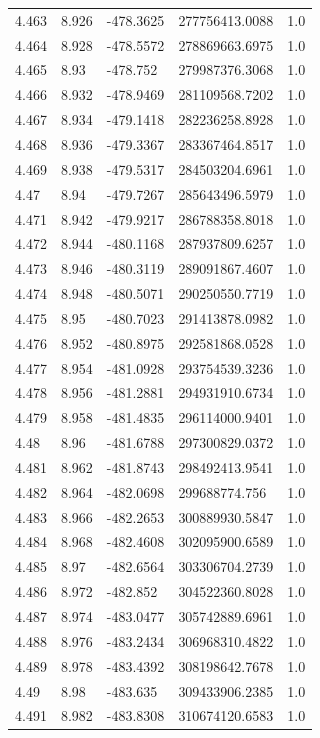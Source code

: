 \begin{tabular}{lllll}
4.463 & 8.926 & -478.3625 & 277756413.0088 & 1.0 \\
4.464 & 8.928 & -478.5572 & 278869663.6975 & 1.0 \\
4.465 & 8.93 & -478.752 & 279987376.3068 & 1.0 \\
4.466 & 8.932 & -478.9469 & 281109568.7202 & 1.0 \\
4.467 & 8.934 & -479.1418 & 282236258.8928 & 1.0 \\
4.468 & 8.936 & -479.3367 & 283367464.8517 & 1.0 \\
4.469 & 8.938 & -479.5317 & 284503204.6961 & 1.0 \\
4.47 & 8.94 & -479.7267 & 285643496.5979 & 1.0 \\
4.471 & 8.942 & -479.9217 & 286788358.8018 & 1.0 \\
4.472 & 8.944 & -480.1168 & 287937809.6257 & 1.0 \\
4.473 & 8.946 & -480.3119 & 289091867.4607 & 1.0 \\
4.474 & 8.948 & -480.5071 & 290250550.7719 & 1.0 \\
4.475 & 8.95 & -480.7023 & 291413878.0982 & 1.0 \\
4.476 & 8.952 & -480.8975 & 292581868.0528 & 1.0 \\
4.477 & 8.954 & -481.0928 & 293754539.3236 & 1.0 \\
4.478 & 8.956 & -481.2881 & 294931910.6734 & 1.0 \\
4.479 & 8.958 & -481.4835 & 296114000.9401 & 1.0 \\
4.48 & 8.96 & -481.6788 & 297300829.0372 & 1.0 \\
4.481 & 8.962 & -481.8743 & 298492413.9541 & 1.0 \\
4.482 & 8.964 & -482.0698 & 299688774.756 & 1.0 \\
4.483 & 8.966 & -482.2653 & 300889930.5847 & 1.0 \\
4.484 & 8.968 & -482.4608 & 302095900.6589 & 1.0 \\
4.485 & 8.97 & -482.6564 & 303306704.2739 & 1.0 \\
4.486 & 8.972 & -482.852 & 304522360.8028 & 1.0 \\
4.487 & 8.974 & -483.0477 & 305742889.6961 & 1.0 \\
4.488 & 8.976 & -483.2434 & 306968310.4822 & 1.0 \\
4.489 & 8.978 & -483.4392 & 308198642.7678 & 1.0 \\
4.49 & 8.98 & -483.635 & 309433906.2385 & 1.0 \\
4.491 & 8.982 & -483.8308 & 310674120.6583 & 1.0 \\

\end{tabular}
